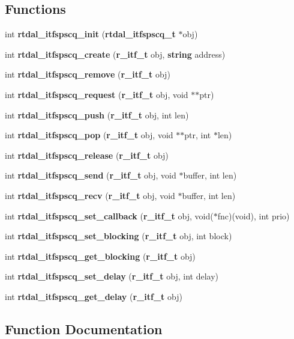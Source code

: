 \subsection*{Functions}
\begin{DoxyCompactItemize}
\item 
int {\bf rtdal\-\_\-itfspscq\-\_\-init} ({\bf rtdal\-\_\-itfspscq\-\_\-t} $\ast$obj)
\item 
int {\bf rtdal\-\_\-itfspscq\-\_\-create} ({\bf r\-\_\-itf\-\_\-t} obj, {\bf string} address)
\item 
int {\bf rtdal\-\_\-itfspscq\-\_\-remove} ({\bf r\-\_\-itf\-\_\-t} obj)
\item 
int {\bf rtdal\-\_\-itfspscq\-\_\-request} ({\bf r\-\_\-itf\-\_\-t} obj, void $\ast$$\ast$ptr)
\item 
int {\bf rtdal\-\_\-itfspscq\-\_\-push} ({\bf r\-\_\-itf\-\_\-t} obj, int len)
\item 
int {\bf rtdal\-\_\-itfspscq\-\_\-pop} ({\bf r\-\_\-itf\-\_\-t} obj, void $\ast$$\ast$ptr, int $\ast$len)
\item 
int {\bf rtdal\-\_\-itfspscq\-\_\-release} ({\bf r\-\_\-itf\-\_\-t} obj)
\item 
int {\bf rtdal\-\_\-itfspscq\-\_\-send} ({\bf r\-\_\-itf\-\_\-t} obj, void $\ast$buffer, int len)
\item 
int {\bf rtdal\-\_\-itfspscq\-\_\-recv} ({\bf r\-\_\-itf\-\_\-t} obj, void $\ast$buffer, int len)
\item 
int {\bf rtdal\-\_\-itfspscq\-\_\-set\-\_\-callback} ({\bf r\-\_\-itf\-\_\-t} obj, void($\ast$fnc)(void), int prio)
\item 
int {\bf rtdal\-\_\-itfspscq\-\_\-set\-\_\-blocking} ({\bf r\-\_\-itf\-\_\-t} obj, int block)
\item 
int {\bf rtdal\-\_\-itfspscq\-\_\-get\-\_\-blocking} ({\bf r\-\_\-itf\-\_\-t} obj)
\item 
int {\bf rtdal\-\_\-itfspscq\-\_\-set\-\_\-delay} ({\bf r\-\_\-itf\-\_\-t} obj, int delay)
\item 
int {\bf rtdal\-\_\-itfspscq\-\_\-get\-\_\-delay} ({\bf r\-\_\-itf\-\_\-t} obj)
\end{DoxyCompactItemize}


\subsection{Function Documentation}
